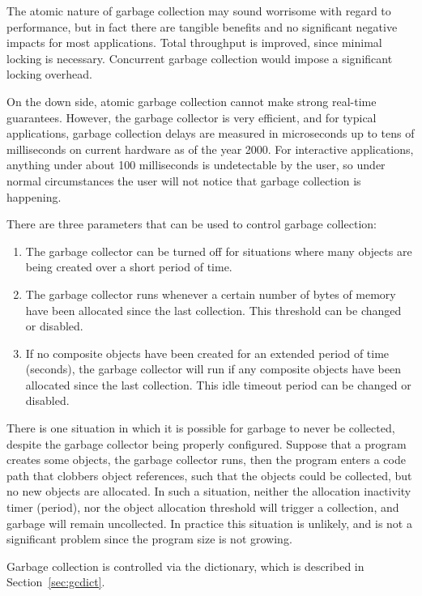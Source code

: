 The atomic nature of garbage collection may sound worrisome with regard to
performance, but in fact there are tangible benefits and no significant negative
impacts for most applications.  Total throughput is improved, since minimal
locking is necessary.  Concurrent garbage collection would impose a significant
locking overhead.

On the down side, atomic garbage collection cannot make strong real-time
guarantees.  However, the garbage collector is very efficient, and for typical
applications, garbage collection delays are measured in microseconds up to tens
of milliseconds on current hardware as of the year 2000.  For interactive
applications, anything under about 100 milliseconds is undetectable by the user,
so under normal circumstances the user will not notice that garbage collection
is happening.

There are three parameters that can be used to control garbage collection:
\begin{enumerate}
\item{The garbage collector can be turned off for situations where many objects
are being created over a short period of time.}
\item{The garbage collector runs whenever a certain number of bytes of memory
have been allocated since the last collection.  This threshold can be changed or
disabled.}
\item{If no composite objects have been created for an extended period of time
(seconds), the garbage collector will run if any composite objects have been
allocated since the last collection.  This idle timeout period can be changed or
disabled.}
\end{enumerate}

There is one situation in which it is possible for garbage to never be
collected, despite the garbage collector being properly configured.  Suppose
that a program creates some objects, the garbage collector runs, then the
program enters a code path that clobbers object references, such that the
objects could be collected, but no new objects are allocated.  In such a
situation, neither the allocation inactivity timer (period), nor the object
allocation threshold will trigger a collection, and garbage will remain
uncollected.  In practice this situation is unlikely, and is not a significant
problem since the program size is not growing.

Garbage collection is controlled via the 
dictionary, which is described in Section~\ref{sec:gcdict}.


